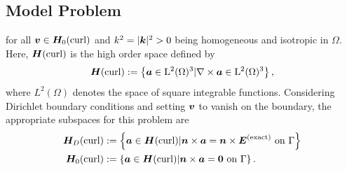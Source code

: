 \documentclass[a4paper,12]{elsarticle}
\theoremstyle{definition}
\renewcommand{\vec}[1]{\mbox{\boldmath$#1$}}
\newcommand{\curl}{\nabla \times}
\begin{document}
\subsection{Model Problem}
%
for all $\vec{v} \in \boldsymbol{H}_0(\rm{curl})$ and $k^2 = |\vec{k}|^2 > 0$ being homogeneous and isotropic in $\Omega$. Here, $\boldsymbol{H}(\rm{curl})$ is the high order space defined by
\begin{equation*}
\boldsymbol{H}(\rm{curl}) := \left\{ \vec{a} \in L^2(\Omega)^3 | \curl \vec{a} \in L^2(\Omega)^3\right\},
\end{equation*}
where $L^2(\Omega)$ denotes the space of square integrable functions. Considering Dirichlet boundary conditions and setting $\vec{v}$ to vanish on the boundary, the appropriate subspaces for this problem are
\begin{equation*}
\begin{alignedat}{2}
\boldsymbol{H}_D(\rm{curl}) &:= \left\{ \vec{a} \in \vec{H}(\rm{curl}) | \vec{n}\times \vec{a} = \vec{n} \times \vec{E}^{(exact)} \text{ on } \Gamma\right\}\\
\boldsymbol{H}_0(\rm{curl}) &:= \left\{ \vec{a} \in \vec{H}(\rm{curl}) | \vec{n}\times \vec{a} = \vec{0} \text{ on } \Gamma\right\}.
\end{alignedat}
\end{equation*}
\end{document}
